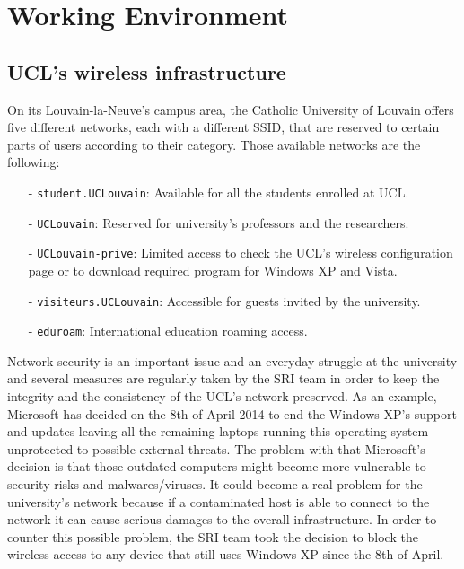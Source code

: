 
\chapter{Working Environment} %

\label{Chapter2} %




\section{UCL's wireless infrastructure}

On its Louvain-la-Neuve's campus area, the Catholic University of Louvain offers five different networks, each with a different SSID, that are reserved to certain parts of users according to their category. Those available networks are the following:
\begin{itemize}
	\item[-] \texttt{student.UCLouvain}: Available for all the students enrolled at UCL.
	\item[-] \texttt{UCLouvain}: Reserved for university's professors and the researchers.
	\item[-] \texttt{UCLouvain-prive}: Limited access to check the UCL's wireless configuration page or to download required program for Windows XP and Vista.
	\item[-] \texttt{visiteurs.UCLouvain}: Accessible for guests invited by the university.
	\item[-] \texttt{eduroam}: International education roaming access.
\end{itemize}

Network security is an important issue and an everyday struggle at the university and several measures are regularly taken by the SRI team in order to keep the integrity and the consistency of the UCL's network preserved. As an example, Microsoft has decided on the 8th of April 2014 to end the Windows XP's support and updates leaving all the remaining laptops running this operating system unprotected to possible external threats\cite{windows}. The problem with that Microsoft's decision is that those outdated computers might become more vulnerable to security risks and malwares/viruses. It could become a real problem for the university's network because if a contaminated host is able to connect to the network it can cause serious damages to the overall infrastructure. In order to counter this possible problem, the SRI team took the decision to block the wireless access to any device that still uses Windows XP since the 8th of April.

